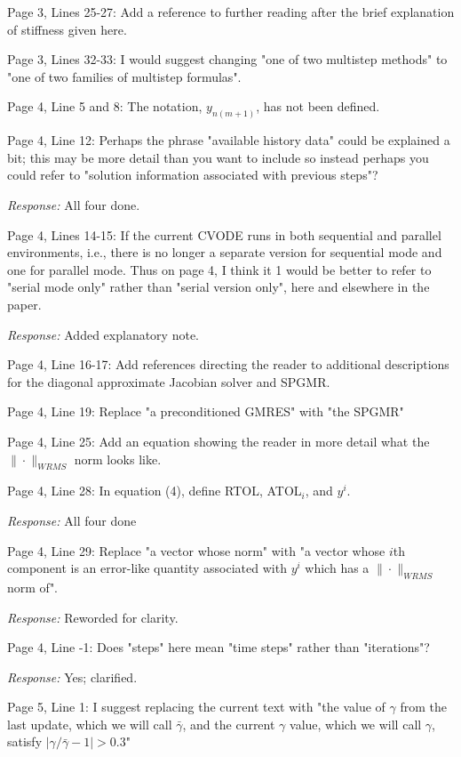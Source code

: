 \documentclass[12pt]{letter}
\begin{document}
Page 3, Lines 25-27: Add a reference to further reading after the
brief explanation of stiffness given here.

Page 3, Lines 32-33: I would suggest changing "one of two multistep
methods" to "one of two families of multistep formulas".

Page 4, Line 5 and 8: The notation, $y_{n(m+1)}$, has not been defined.  

Page 4, Line 12: Perhaps the phrase "available history data" could be
explained a bit; this may be more detail than you want to include so
instead perhaps you could refer to "solution information associated
with previous steps"?

{\em Response:} All four done.

Page 4, Lines 14-15: If the current CVODE runs in both sequential and
parallel environments, i.e., there is no longer a separate version for
sequential mode and one for parallel mode. Thus on page 4, I think it
1 would be better to refer to "serial mode only" rather than "serial
version only", here and elsewhere in the paper.

{\em Response:} Added explanatory note.

Page 4, Line 16-17: Add references directing the reader to additional
descriptions for the diagonal approximate Jacobian solver and SPGMR.

Page 4, Line 19: Replace "a preconditioned GMRES" with "the SPGMR"

Page 4, Line 25: Add an equation showing the reader in more detail
what the $\|\cdot\|_{WRMS}$ norm looks like.

Page 4, Line 28: In equation (4), define RTOL, ATOL$_i$, and $y^i$.

{\em Response:} All four done

Page 4, Line 29: Replace "a vector whose norm" with "a vector whose $i$th
component is an error-like quantity associated with $y^i$ which has a 
$\|\cdot\|_{WRMS}$ norm of".

{\em Response:} Reworded for clarity.

Page 4, Line -1: Does "steps" here mean "time steps" rather than "iterations"?

{\em Response:} Yes; clarified.

Page 5, Line 1: I suggest replacing the current text with "the value
of $\gamma$ from the last update, which we will call $\bar{\gamma}$,
and the current $\gamma$ value, which we will call $\gamma$, satisfy 
$|\gamma/\bar{\gamma} - 1| > 0.3 $"
\end{document}
